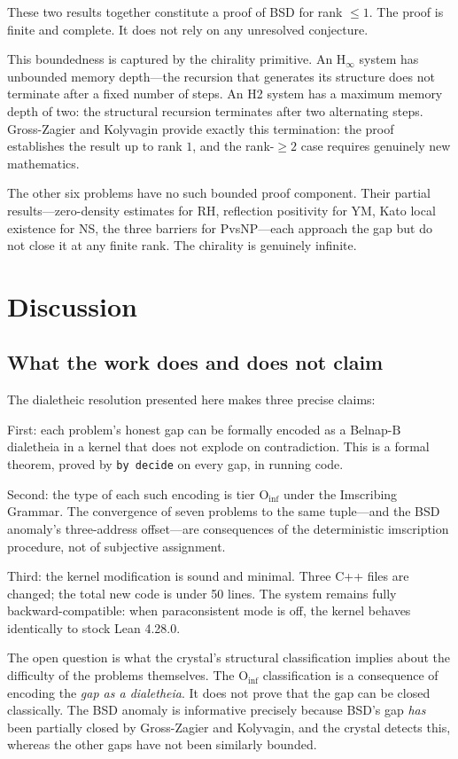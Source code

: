 \documentclass[11pt,a4paper]{article}
\theoremstyle{definition}
\begin{document}
These two results together constitute a proof of BSD for rank $\le 1$. The
proof is finite and complete. It does not rely on any unresolved conjecture.

This boundedness is captured by the chirality primitive. An $\text{H}_\infty$
system has unbounded memory depth---the recursion that generates its structure
does not terminate after a fixed number of steps. An H2 system has a maximum
memory depth of two: the structural recursion terminates after two alternating
steps. Gross-Zagier and Kolyvagin provide exactly this termination: the proof
establishes the result up to rank $1$, and the rank-$\ge 2$ case requires
genuinely new mathematics.

The other six problems have no such bounded proof component. Their partial
results---zero-density estimates for RH, reflection positivity for YM, Kato
local existence for NS, the three barriers for PvsNP---each approach the gap
but do not close it at any finite rank. The chirality is genuinely infinite.

\section{Discussion}

\subsection{What the work does and does not claim}

The dialetheic resolution presented here makes three precise claims:

First: each problem's honest gap can be formally encoded as a
Belnap-$\text{B}$ dialetheia in a kernel that does not explode on contradiction.
This is a formal theorem, proved by {\tt by decide} on every gap, in running
code.

Second: the type of each such encoding is tier $\text{O}_{\text{inf}}$
under the Imscribing Grammar. The convergence of seven problems to the same
tuple---and the BSD anomaly's three-address offset---are consequences of the
deterministic imscription procedure, not of subjective assignment.

Third: the kernel modification is sound and minimal. Three C++ files are
changed; the total new code is under 50 lines. The system remains fully
backward-compatible: when paraconsistent mode is off, the kernel behaves
identically to stock Lean 4.28.0.

The open question is what the crystal's structural classification implies
about the difficulty of the problems themselves. The $\text{O}_{\text{inf}}$
classification is a consequence of encoding the {\it gap as a dialetheia}. It
does not prove that the gap can be closed classically. The BSD anomaly is
informative precisely because BSD's gap {\it has} been partially closed by
Gross-Zagier and Kolyvagin, and the crystal detects this, whereas the other
gaps have not been similarly bounded.
\end{document}
